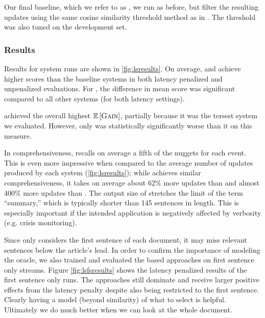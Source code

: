 Our final baseline, which we
 refer to as \modelLSCos, we run \modelLS{} as before, but filter the
 resulting updates using the same cosine similarity threshold method as in
 \modelCos. The threshold was also tuned on the development set. 


 \subsubsection{Results}
 

  Results for system runs are shown in \autoref{fig:lsresults}.  On average,
  \modelLS{} and \modelLSCos{} achieve higher \fmeasure{} scores than the baseline
 systems in both latency penalized and unpenalized evaluations. For
 \modelLSCos, the difference in mean \fmeasure{} score was significant compared
 to all other systems (for both latency settings).
 
 \sap{} achieved the overall highest $\mathbb{E}\left[\textsc{Gain}\right]$, partially because
 it was the tersest system we evaluated. However, only \modelCos{} was
 statistically significantly worse than it on this measure. %
 
 In comprehensiveness, \modelLS{} recalls on average a fifth of the nuggets
 for each event. This is even more impressive when  compared to the average
 number of updates produced by each system (\autoref{fig:lsresults}); while
 \modelCos{} achieves similar comprehensiveness, it takes on average about
 62\% more updates than \modelLS{} and almost 400\% more updates than
 \modelLSCos. The output size of \modelCos{} stretches the limit of the
 term ``summary,'' which is typically shorter than 145 sentences in length.
 This is especially important if the intended application is negatively
 affected by verbosity (e.g. crisis monitoring).

 

 Since \modelCos{} only considers the first sentence of each document, it
 may miss relevant sentences below the article's lead. In order to confirm the
 importance of modeling the oracle, we also trained and evaluated the
 \modelLS{} based approaches on first sentence only streams. Figure
 \ref{fig:lsfsresults} shows the latency penalized results of the first
 sentence only runs.  The \modelLS{} approaches still dominate \modelCos{}
 and receive larger positive effects from the latency penalty despite also
 being restricted to the first sentence. Clearly having a model (beyond
 similarity) of what to select is helpful. Ultimately we do much better when
 we can look at the whole document.
  
